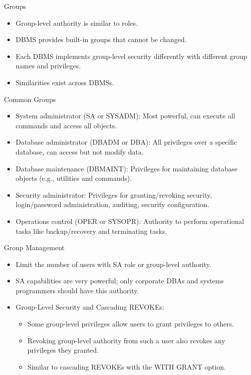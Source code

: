 \documentclass[aspectratio=169]{beamer}
\begin{document}
\begin{frame}{Groups}
    \begin{itemize}
        \item Group-level authority is similar to roles.
        \item DBMS provides built-in groups that cannot be changed.
        \item Each DBMS implements group-level security differently with different group names and privileges.
        \item Similarities exist across DBMSs.
    \end{itemize}
\end{frame}

\begin{frame}{Common Groups}
    \begin{itemize}
        \item System administrator (SA or SYSADM): Most powerful, can execute all commands and access all objects.
        \item Database administrator (DBADM or DBA): All privileges over a specific database, can access but not modify data.
        \item Database maintenance (DBMAINT): Privileges for maintaining database objects (e.g., utilities and commands).
        \item Security administrator: Privileges for granting/revoking security, login/password administration, auditing, security configuration.
        \item Operations control (OPER or SYSOPR): Authority to perform operational tasks like backup/recovery and terminating tasks.
    \end{itemize}
\end{frame}

\begin{frame}{Group Management}
    \begin{itemize}
        \item Limit the number of users with SA role or group-level authority.
        \item SA capabilities are very powerful; only corporate DBAs and systems programmers should have this authority.
        \item Group-Level Security and Cascading REVOKEs:
        \begin{itemize}
            \item Some group-level privileges allow users to grant privileges to others.
            \item Revoking group-level authority from such a user also revokes any privileges they granted.
            \item Similar to cascading REVOKEs with the WITH GRANT option.
        \end{itemize}
    \end{itemize}
\end{frame}
\end{document}
